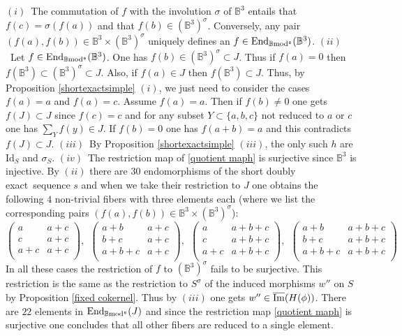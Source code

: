 \documentclass[12pt]{article}
\def\End{{\rm End}}
\def\id{{\rm id}}
\def\B{{\mathbb B}}
\def\imm{\overline{\rm Im}}
\def\exxx{{doubly exact}~}
\def\id{{\mbox{Id}}}
\def\End{{\mbox{End}}}
\def\b2{{\rm \B mod^{\mathfrak s}}}
\begin{document}
\proof $(i)$~The commutation of $f$ with the involution $\sigma$ of $\B^3$ entails that $f(c)=\sigma(f(a))$ and that $f(b)\in (\B^3)^\sigma$. Conversely, any pair $(f(a),f(b))\in \B^3\times (\B^3)^\sigma$ uniquely defines an $f\in \End_\b2(\B^3)$.\newline
$(ii)$~Let  $f\in \End_\b2(\B^3)$. One has $f(b)\in (\B^3)^\sigma\subset J$. Thus if $f(a)=0$ then $f(\B^3)\subset (\B^3)^\sigma\subset J$. Also, if $f(a)\in J$ then
$f(\B^3)\subset J$. Thus, by Proposition \ref{shortexactsimple} $(i)$, we just need to consider the cases $f(a)=a$ and $f(a)=c$.  Assume $f(a)=a$. Then if $f(b)\neq 0$ one gets $f(J)\subset J$ since $f(c)=c$ and for any subset $Y\subset 
\{a,b,c\}$ not reduced to $a$ or $c$ one has $\sum_Y f(y)\in J$. If $f(b)= 0$ one has $f(a+b)=a$ and this contradicts $f(J)\subset J$.\newline
$(iii)$~By Proposition \ref{shortexactsimple} $(iii)$, the only such $h$ are $\id_S$ and $\sigma_S$.\newline
 $(iv)$~The restriction map of \eqref{quotient maph} is surjective since $\B^3$ is injective. By $(ii)$ there are $30$ endomorphisms of the short \exxx sequence $s$ and when we take their restriction to $J$ one obtains the following $4$ non-trivial fibers with three elements each (where we list the corresponding pairs $(f(a),f(b))\in \B^3\times (\B^3)^\sigma$): 
 $$
 \left(
\begin{array}{cc}
 a & a+c \\
 c & a+c \\
 a+c & a+c \\
\end{array}
\right), \  \ \left(
\begin{array}{cc}
 a+b & a+c \\
 b+c & a+c \\
 a+b+c & a+c \\
\end{array}
\right), \ \ \left(
\begin{array}{cc}
 a & a+b+c \\
 c & a+b+c \\
 a+c & a+b+c \\
\end{array}
\right),\ \ \left(
\begin{array}{cc}
 a+b & a+b+c \\
 b+c & a+b+c \\
 a+b+c & a+b+c \\
\end{array}
\right)
$$ 
In all these cases the restriction of $f$ to $(\B^3)^\sigma$ fails to be surjective. This restriction is the same as the restriction to $S^\sigma$ of the induced morphisms $w''$ on $S$ by Proposition \ref{fixed cokernel}. Thus by $(iii)$ one gets $w''\in \imm(H(\phi))$.
There are $22$ elements in $\End_\b2(J)$ and since the  restriction map \eqref{quotient maph} is surjective one concludes that all other fibers are reduced to a single element. \endproof 
\end{document}
